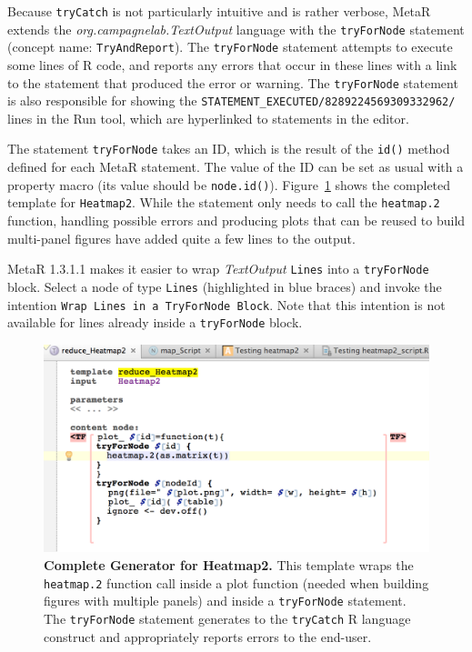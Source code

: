 Because \texttt{tryCatch} is not particularly intuitive and is rather verbose, MetaR extends the \textit{org.campagnelab.TextOutput} language with the \texttt{tryForNode} statement (concept name: \texttt{TryAndReport}). The \texttt{tryForNode} statement attempts to execute some lines of R code, and reports any errors that occur in these lines with a link to the statement that produced the error or warning. The \texttt{tryForNode} statement is also responsible for showing the \texttt{STATEMENT\_EXECUTED/\allowbreak{}8289224\allowbreak{}569309332962/} lines in the Run tool, which are hyperlinked to statements in the editor. 

The statement \texttt{tryForNode} takes an ID, which is the result of the \texttt{id()} method defined for each MetaR statement. The value of the ID can be set as usual with a property macro (its value should be \texttt{node.id()}). Figure~\ref{fig:Heatmap2GeneratorComplete} shows the completed template for \texttt{Heatmap2}. While the statement only needs to call the \texttt{heatmap.2} function, handling possible errors and producing plots that can be reused to build multi-panel figures have added quite a few lines to the output.
\begin{remark}
MetaR 1.3.1.1 makes it easier to wrap \textit{TextOutput} \texttt{Lines} into a \texttt{tryForNode} block. Select a node of type \texttt{Lines} (highlighted in blue braces) and invoke the intention \texttt{Wrap Lines in a TryForNode Block}. Note that this intention is not available for lines already inside a \texttt{tryForNode} block.
\end{remark}

\begin{figure}[h!tbp]
  \centering
  \includegraphics[width=\figWidthWide]{figures/Heatmap2GeneratorComplete.png}
\caption[Complete Generator for Heatmap2.]{\textbf{Complete Generator for Heatmap2.} This template wraps the \texttt{heatmap.2} function call inside a plot function (needed when building figures with multiple panels) and inside a \texttt{tryForNode} statement. The \texttt{tryForNode} statement generates to the \texttt{tryCatch} R language construct and appropriately reports errors to the end-user.}
\label{fig:Heatmap2GeneratorComplete}
\end{figure}
 
